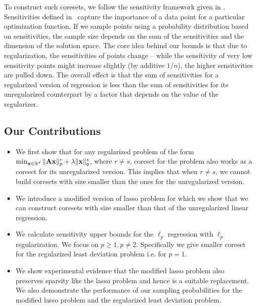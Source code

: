 To construct such coresets, we follow the sensitivity framework given in \cite{feldman2011unified}. Sensitivities defined in~\cite{langberg2010universal} capture the importance of a data point for a particular optimization function. If we sample points using a probability distribution based on sensitivities, the sample size depends on the sum of the sensitivities and the dimension of the solution space. The core idea behind our bounds is that due to regularization, the sensitivities of points change -- while the sensitivity of very low sensitivity points might increase slightly (by additive $1/n$), the higher sensitivities are pulled down. The overall effect is that 
the sum of sensitivities for a regularized version of regression is less than the sum of sensitivities for its unregularized counterpart by a factor that depends on the value of the regularizer. 

\subsection{Our Contributions}
\begin{itemize}
	\item We first show that for any regularized problem of the form $\min _{\mathbf{x} \in \mathbb{R}^d} \|\mathbf{Ax}\|_p^r + \lambda \|\mathbf{x}\|_q^s $, where $r \neq s$, coreset for the problem also works as a coreset for its unregularized version. This implies that when $r \neq s$, we cannot build coresets with size smaller than the ones for the unregularized version.
	\item We introduce a modified version of lasso problem for which we show that we can construct coresets with size smaller than that of the unregularized linear regression.
	\item We calculate sensitivity upper bounds for the  $\ell_p $ regression with $\ell_p$ regularization. We focus on $p \geq 1, p\neq 2$. Specifically we give smaller coreset for the regularized least deviation problem i.e. for $p=1$.
	\item We show experimental evidence that the modified lasso problem also preserves sparsity like the lasso problem and hence is a suitable replacement. We also demonstrate the performance of our sampling probabilities for the modified lasso problem and the regularized least deviation problem.
\end{itemize}
